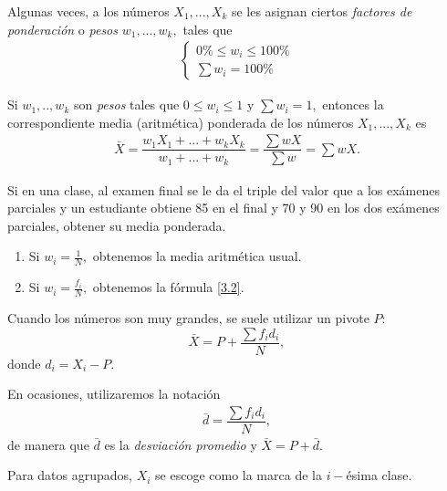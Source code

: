 Algunas veces, a los números $X_{1},...,X_{k}$ se les asignan ciertos \emph{factores de ponderación} o \emph{pesos} $w_{1},...,w_{k},$ tales que \begin{align}
	\begin{cases}
		0\% \leq w_{i}\leq 100\% \\
		\sum w_{i} = 100\%
	\end{cases}
\end{align}


\begin{definicion}
	Si $w_{1},..,w_{k}$ son \emph{pesos} tales que $0\leq w_{i}\leq 1$ y $\sum w_{i}=1,$ entonces la correspondiente media (aritmética) ponderada de los números $X_{1},...,X_{k}$ es
	\begin{align}
		\bar{X}= \dfrac{w_{1}X_{1}+...+w_{k}X_{k}}{w_{1}+...+w_{k}}=\dfrac{\sum wX}{\sum w}=\sum wX.
	\end{align}
\end{definicion}



\begin{ejemplo}
	Si en una clase, al examen final se le da el triple del valor que a los exámenes parciales y un estudiante obtiene 85 en el final y 70 y 90 en los dos exámenes parciales, obtener su media ponderada.
\end{ejemplo}



\begin{enumerate}
	\item Si $w_{i}=\frac{1}{N},$ obtenemos la media aritmética usual. 
	\item Si $w_{i}=\frac{f_{i}}{N},$ obtenemos la fórmula \eqref{3.2}.
\end{enumerate}

Cuando los números son muy grandes, se suele utilizar un pivote $P:$ 
$$
\bar{X}=P+\dfrac{\sum f_{i}d_{i}}{N},
$$
donde $d_{i}=X_{i}-P.$

En ocasiones, utilizaremos la notación
\begin{align}
	\bar{d}=\dfrac{\sum f_{i}d_{i}}{N},
\end{align}
de manera que $\bar{d}$ es la \emph{desviación promedio} y $\bar{X}=P+\bar{d}.$



\begin{observacion}
	
	Para datos agrupados, $X_{i}$ se escoge como la marca de la $i-$ésima clase.
\end{observacion}


